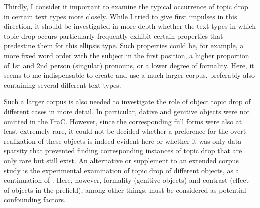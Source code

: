 Thirdly, I consider it important to examine the typical occurrence of topic drop in certain text types  more closely.
While I tried to give first impulses in this direction, it should be investigated in more depth whether the text types in which topic drop occurs particularly frequently exhibit certain properties that predestine them for this ellipsis type.
Such properties could be, for example, a more fixed word order with the subject in the first position, a higher proportion of 1st and 2nd person (singular) pronouns, or a lower degree of formality.
Here, it seems to me indispensable to create and use a much larger corpus,  preferably also containing several different text types. 

Such a larger corpus  is also needed to investigate the role of object topic drop of different cases in more detail.
In particular, dative  and genitive  objects were not omitted in the FraC.
However, since the corresponding full forms were also at least extremely rare, it could not be decided whether a preference for the overt realization of these objects is indeed evident here or whether it was only data sparsity that prevented finding corresponding instances of topic drop that are only rare but still exist.
An alternative or supplement to an extended corpus study is the experimental examination of topic drop of different objects, as a continuation of \citet{trutkowski2018}.
Here, however, formality (genitive  objects) and contrast (effect of objects in the prefield), among other things, must be considered as potential confounding factors.
